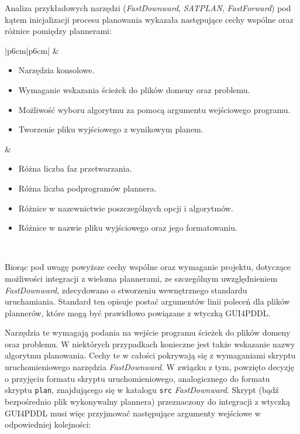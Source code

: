 Analiza przykładowych narzędzi (\textit{FastDownward}, \textit{SATPLAN}, \textit{FastForward}) pod kątem inicjalizacji procesu planowania wykazała następujące cechy wspólne oraz różnice pomiędzy plannerami:
\begin{table}[h]
\centering
\caption{Cechy wspólne oraz różnice w uruchamianiu pomiędzy przykładowymi plannerami.}
\label{plannersTable}
\begin{tabular}{|p{6cm}|p{6cm}|}
\hline
{} 
    &  
   \\
   \hline
\begin{itemize}
\item Narzędzia konsolowe.
\item Wymaganie wskazania ścieżek do plików domeny oraz problemu.
\item Możliwość wyboru algorytmu za pomocą argumentu wejściowego programu.
\item Tworzenie pliku wyjściowego z wynikowym planem.
\end{itemize}
&
\begin{itemize}
\item Różna liczba faz przetwarzania.
\item Różna liczba podprogramów plannera.
\item Różnice w nazewnictwie poszczególnych opcji i algorytmów.
\item Różnice w nazwie pliku wyjściowego oraz jego formatowaniu.
\end{itemize} \\
\hline
\end{tabular}
\end{table}

Biorąc pod uwagę powyższe cechy wspólne oraz wymaganie projektu, dotyczące możliwości integracji z wieloma plannerami, ze szczególnym uwzględnieniem \textit{FastDownward}, zdecydowano o stworzeniu wewnętrznego standardu uruchamiania. Standard ten opisuje postać argumentów linii poleceń dla plików plannerów, które mogą być prawidłowo powiązane z wtyczką GUI4PDDL. 

Narzędzia te wymagają podania na wejście programu ścieżek do plików domeny oraz problemu. W niektórych przypadkach konieczne jest także wskazanie nazwy algorytmu planowania. Cechy te w całości pokrywają się z wymaganiami skryptu uruchomieniowego narzędzia \textit{FastDownward}. W związku z tym, powzięto decyzję o przyjęciu formatu skryptu uruchomieniowego, analogicznego do formatu skryptu \texttt{plan}, znajdującego się w katalogu \texttt{src} \textit{FastDownward}. Skrypt (bądź bezpośrednio plik wykonywalny plannera) przeznaczony do integracji z wtyczką GUI4PDDL musi więc przyjmować następujące argumenty wejściowe w odpowiedniej kolejności:

